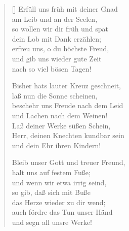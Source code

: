 \begin{multicols}{2}
\begin{verse}[\versewidth]
 Erfüll uns früh mit deiner Gnad\\
am Leib und an der Seelen,\\
so wollen wir dir früh und spat\\
dein Lob mit Dank erzählen;\\
erfreu uns, o du höchste Freud,\\
und gib uns wieder gute Zeit\\
nach so viel bösen Tagen!

 Bisher hats lauter Kreuz geschneit,\\
laß nun die Sonne scheinen,\\
beschehr uns Freude nach dem Leid\\
und Lachen nach dem Weinen!\\
Laß deiner Werke süßen Schein,\\
Herr, deinen Knechten kundbar sein\\
und dein Ehr ihren Kindern!

 Bleib unser Gott und treuer Freund,\\
halt uns auf festem Fuße;\\
und wenn wir etwa irrig seind,\\
so gib, daß sich mit Buße\\
das Herze wieder zu dir wend;\\
auch fördre das Tun unser Händ\\
und segn all unsre Werke!

\end{verse}
\end{multicols}
